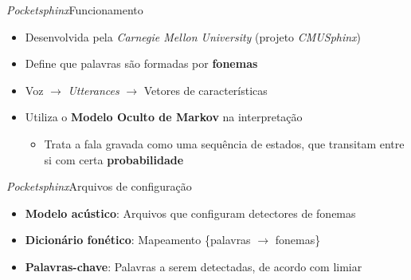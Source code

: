 \begin{frame}{\textit{Pocketsphinx}}{Funcionamento}

\begin{itemize}
\item Desenvolvida pela \textit{Carnegie Mellon University} (projeto \textit{CMUSphinx})

\item Define que palavras são formadas por \textbf{fonemas}

\item<2-> Voz $\rightarrow$ \textit{Utterances} $\rightarrow$ Vetores de características

\item<3-> Utiliza o \textbf{Modelo Oculto de Markov} na interpretação

\begin{itemize}
  \item Trata a fala gravada como uma sequência de estados, que transitam entre si com certa \textbf{probabilidade}
\end{itemize}
\end{itemize}


\end{frame}


\begin{frame}{\textit{Pocketsphinx}}{Arquivos de configuração}

\begin{itemize}
\item \textbf{Modelo acústico}: Arquivos que configuram detectores de fonemas

\item<2-> \textbf{Dicionário fonético}: Mapeamento \{palavras \(\rightarrow\) fonemas\}
\end{itemize}


\begin{itemize}
\item<3-> \textbf{Palavras-chave}: Palavras a serem detectadas, de acordo com limiar
\end{itemize}

\end{frame}

